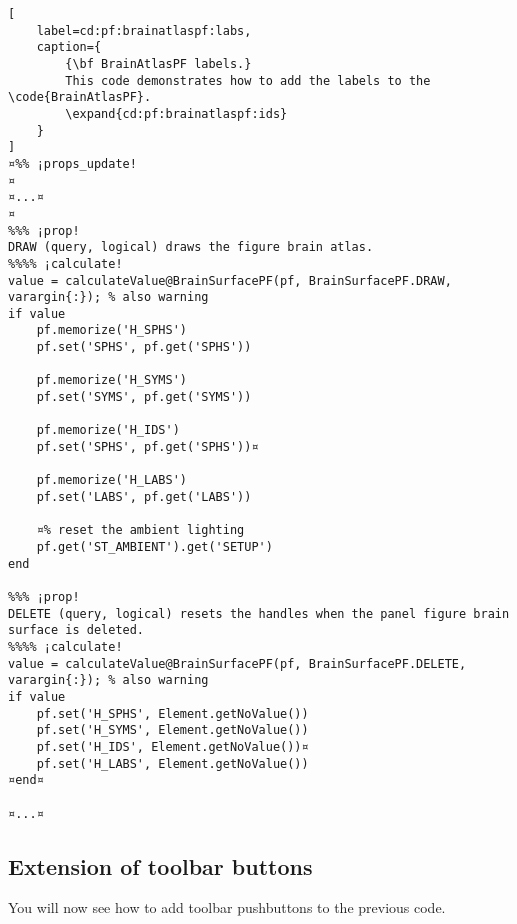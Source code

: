 \documentclass{tufte-handout}
\begin{document}
\begin{lstlisting}[
	label=cd:pf:brainatlaspf:labs,
	caption={
		{\bf BrainAtlasPF labels.}
		This code demonstrates how to add the labels to the \code{BrainAtlasPF}.
		\expand{cd:pf:brainatlaspf:ids}
	}
]
¤%% ¡props_update!
¤
¤...¤
¤
%%% ¡prop!
DRAW (query, logical) draws the figure brain atlas.
%%%% ¡calculate!
value = calculateValue@BrainSurfacePF(pf, BrainSurfacePF.DRAW, varargin{:}); % also warning
if value
    pf.memorize('H_SPHS')
    pf.set('SPHS', pf.get('SPHS'))

    pf.memorize('H_SYMS')
    pf.set('SYMS', pf.get('SYMS'))

    pf.memorize('H_IDS')
    pf.set('SPHS', pf.get('SPHS'))¤

    pf.memorize('H_LABS')
    pf.set('LABS', pf.get('LABS'))

    ¤% reset the ambient lighting
    pf.get('ST_AMBIENT').get('SETUP')
end

%%% ¡prop!
DELETE (query, logical) resets the handles when the panel figure brain surface is deleted.
%%%% ¡calculate!
value = calculateValue@BrainSurfacePF(pf, BrainSurfacePF.DELETE, varargin{:}); % also warning
if value
    pf.set('H_SPHS', Element.getNoValue())
    pf.set('H_SYMS', Element.getNoValue())
    pf.set('H_IDS', Element.getNoValue())¤
    pf.set('H_LABS', Element.getNoValue())
¤end¤

¤...¤
\end{lstlisting}

\subsection{Extension of toolbar buttons}

You will now see how to add toolbar pushbuttons to the previous code.
\end{document}
